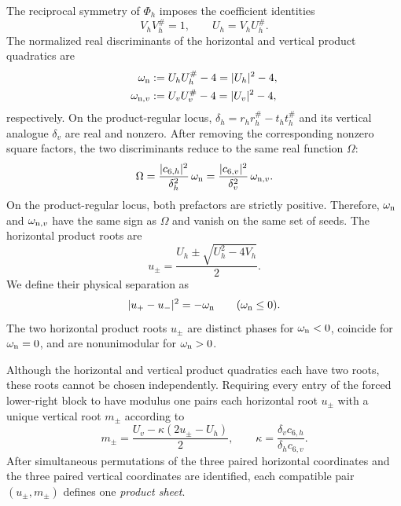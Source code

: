 The reciprocal symmetry of $\Phi_h$ imposes the coefficient identities
\begin{equation}
V_hV_h^\#=1,
\qquad
U_h=V_hU_h^\#.
\label{eq:self-inversive-product-data}
\end{equation}
The normalized real discriminants of the horizontal and vertical product quadratics are
\begin{equation}
\begin{aligned}
\omega_{\rm n}&:=U_hU_h^\#-4=|U_h|^2-4,\\
\omega_{{\rm n},v}&:=U_vU_v^\#-4=|U_v|^2-4,
\end{aligned}
\label{eq:normalized-product-discriminants}
\end{equation}
respectively.
On the product-regular locus, $\delta_h=r_hr_h^\#-t_ht_h^\#$ and its vertical analogue $\delta_v$ are real and nonzero. After removing the corresponding nonzero square factors, the two discriminants reduce to the same real function $\Omega$:
\begin{equation}
\Omega=\frac{|c_{6,h}|^2}{\delta_h^2}\,\omega_{\rm n}
=\frac{|c_{6,v}|^2}{\delta_v^2}\,\omega_{{\rm n},v}.
\label{eq:omega-residual-discriminant-bridge}
\end{equation}
On the product-regular locus, both prefactors are strictly positive. Therefore, $\omega_{\rm n}$ and $\omega_{{\rm n},v}$ have the same sign as $\Omega$ and vanish on the same set of seeds. The horizontal product roots are
\begin{equation}
u_\pm=\frac{U_h\pm\sqrt{U_h^2-4V_h}}{2}.
\label{eq:horizontal-product-roots}
\end{equation}
We define their physical separation as
\begin{equation}
    |u_+-u_-|^2=-\omega_{\rm n}\qquad(\omega_{\rm n}\leq0).
\end{equation}
The two horizontal product roots $u_\pm$ are distinct phases for $\omega_{\rm n}<0$, coincide for $\omega_{\rm n}=0$, and are nonunimodular for $\omega_{\rm n}>0$.

Although the horizontal and vertical product quadratics each have two roots, these roots cannot be chosen independently. Requiring every entry of the forced lower-right block to have modulus one pairs each horizontal root $u_\pm$ with a unique vertical root $m_\pm$ according to
\begin{equation}
m_\pm=\frac{U_v-\kappa(2u_\pm-U_h)}{2},
\qquad
\kappa=\frac{\delta_vc_{6,h}}{\delta_hc_{6,v}}.
\label{eq:affine-minus-matching-main}
\end{equation}
After simultaneous permutations of the three paired horizontal coordinates and the three paired vertical coordinates are identified, each compatible pair $(u_\pm,m_\pm)$ defines one \emph{product sheet}. 

